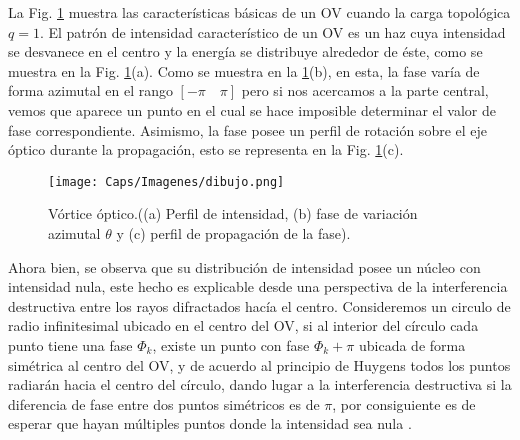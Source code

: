 
La Fig. \ref{fig:VO} muestra las características básicas de un OV cuando la carga topológica $q=1$. El patrón de intensidad característico de un OV es un haz cuya intensidad se desvanece en el centro y la energía se distribuye alrededor de éste, como se muestra en la Fig. \ref{fig:VO}(a). Como se muestra en la \ref{fig:VO}(b), en esta, la fase varía de forma azimutal en el rango $[-\pi \quad \pi]$ pero si nos acercamos a la parte central, vemos que aparece un punto en el cual se hace imposible determinar el valor de fase correspondiente. Asimismo, la fase posee un perfil de rotación sobre el eje óptico durante la propagación, esto se representa en la Fig. \ref{fig:VO}(c).
 

\begin{figure}[!ht]
  \centering
    \texttt{[image: Caps/Imagenes/dibujo.png]}
  \caption[Vórtice óptico.]{Vórtice óptico.((a) Perfil de intensidad, (b) fase de variación azimutal $\theta$ y (c) perfil de propagación de la fase).}
  \label{fig:VO}
\end{figure}

Ahora bien, se observa que su distribución de intensidad posee un núcleo con intensidad nula, este hecho es explicable desde una perspectiva de la interferencia destructiva entre los rayos difractados hacía el centro. Consideremos un circulo de radio infinitesimal ubicado en el centro del OV, si al interior del círculo cada punto tiene una fase $\Phi_k$, existe un punto con fase $\Phi_k + \pi$ ubicada de forma simétrica al centro del OV, y de acuerdo al principio de Huygens \cite{Hecht2000} todos los puntos radiarán hacia el centro del círculo, dando lugar a la interferencia destructiva si la diferencia de fase entre dos puntos simétricos es de $\pi$, por consiguiente es de esperar que hayan múltiples puntos donde la intensidad sea nula \cite{Rozas1999,King2010}.\\


